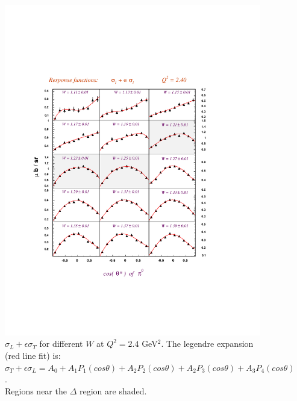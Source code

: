 \begin{figure}[h]
 \includegraphics[width = 15cm, bb=0 100 500 640]{analysis/img/Sigma_lpt_Q2_2.40}
  \caption[$\sigma_L + \epsilon\sigma_T$ for different $W$ at $Q^2 = 2.4$ GeV$^2$]
          { $\sigma_L + \epsilon\sigma_T$ for different $W$ at $Q^2 = 2.4$ GeV$^2$. 
		     The legendre expansion (red line fit) is: 
		     $\sigma_T + \epsilon\sigma_L = A_0 + A_1P_1(cos\theta) + A_2P_2(cos\theta) 
		                                        + A_2P_3(cos\theta) + A_3P_4(cos\theta)$.\\
                     Regions near the $\Delta $ region are shaded.}
 \label{fig:Sigma_lpt_Q2_2.40}
\end{figure}



